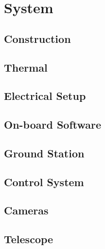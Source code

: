 \documentclass[11pt, aspectratio=169]{beamer}
\begin{document}
\section{System}
\subsection{Construction}
\subsection{Thermal}
\subsection{Electrical Setup}
\subsection{On-board Software}
\subsection{Ground Station}
\subsection{Control System}
\subsection{Cameras}
\subsection{Telescope}

\end{document}
